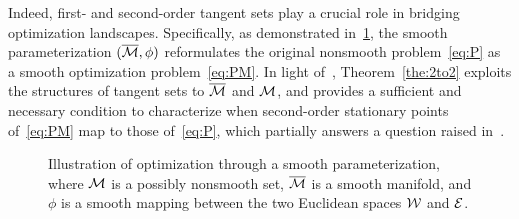 Indeed, first- and second-order tangent sets play a crucial role in bridging optimization landscapes. Specifically, as demonstrated in~\myfig\ref{fig:diagram}, the smooth parameterization $(\overline{\mathcal{M}},\phi)$ reformulates the original nonsmooth problem~\eqref{eq:P} as a smooth optimization problem~\eqref{eq:PM}. In light of~\cite{levin2025effect}, Theorem~\ref{the:2to2} exploits the structures of tangent sets to $\overline{\mathcal{M}}$ and $\mathcal{M}$, and provides a sufficient and necessary condition to characterize when second-order stationary points of~\eqref{eq:PM} map to those of~\eqref{eq:P}, which partially answers a question raised in~\cite[\S 6]{levin2025effect}.


\begin{figure}[htbp]
    \newcommand{\ratio}{0.5}
    \newcommand{\customrectangle}[7]{
            \draw[densely dashed, draw=#6, fill=#7] 
                (#1-#3/2, #2-#4/2) rectangle 
                (#1+#3/2, #2+#4/2); 
            \node at (#1, #2) {#5}; 
        }
    \begin{minipage}{1\textwidth}
    \begin{center}
    \end{center}
    \end{minipage}
    \caption{Illustration of optimization through a smooth parameterization, where $\mathcal{M}$ is a possibly nonsmooth set, $\overline{\mathcal{M}}$ is a smooth manifold, and $\phi$ is a smooth mapping between the two Euclidean spaces $\mathcal{W}$ and $\mathcal{E}$.}
    \label{fig:diagram}
\end{figure}

